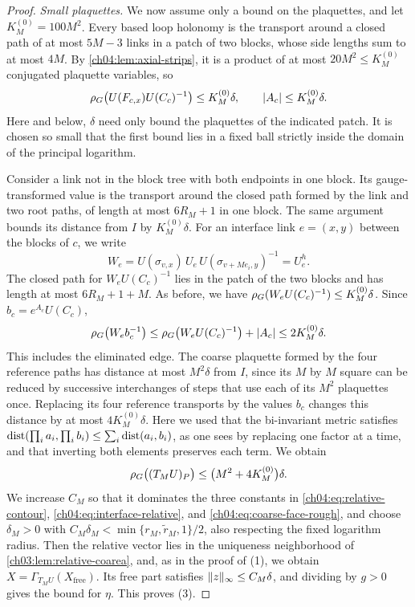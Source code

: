 \begin{proof}
\emph{Small plaquettes.} We now assume only a bound on the plaquettes, and let $K_M^{(0)}=100M^2$. Every based loop holonomy is the transport around a closed path of at most $5M-3$ links in a patch of two blocks, whose side lengths sum to at most $4M$. By \cref{ch04:lem:axial-strips}, it is a product of at most $20M^2\le K_M^{(0)}$ conjugated plaquette variables, so
\begin{equation}\label{ch04:eq:relative-contour}
 \rho_G\bigl(U(F_{c,x})U(C_c)^{-1}\bigr)\le K_M^{(0)}\delta,\qquad\lvert A_c\rvert\le K_M^{(0)}\delta.
\end{equation}
Here and below, $\delta$ need only bound the plaquettes of the indicated patch. It is chosen so small that the first bound lies in a fixed ball strictly inside the domain of the principal logarithm.

Consider a link not in the block tree with both endpoints in one block. Its gauge-transformed value is the transport around the closed path formed by the link and two root paths, of length at most $6R_M+1$ in one block. The same argument bounds its distance from $I$ by $K_M^{(0)}\delta$. For an interface link $e=(x,y)$ between the blocks of $c$, we write
\[
 W_e=U(\sigma_{v,x})\,U_e\,U(\sigma_{v+Me_i,y})^{-1}=U^h_e.
\]
The closed path for $W_eU(C_c)^{-1}$ lies in the patch of the two blocks and has length at most $6R_M+1+M$. As before, we have $\rho_G(W_eU(C_c)^{-1})\le K_M^{(0)}\delta$. Since $b_c=e^{A_c}U(C_c)$,
\begin{equation}\label{ch04:eq:interface-relative}
 \rho_G\bigl(W_eb_c^{-1}\bigr)\le\rho_G\bigl(W_eU(C_c)^{-1}\bigr)+\lvert A_c\rvert\le2K_M^{(0)}\delta.
\end{equation}
This includes the eliminated edge. The coarse plaquette formed by the four reference paths has distance at most $M^2\delta$ from $I$, since its $M$ by $M$ square can be reduced by successive interchanges of steps that use each of its $M^2$ plaquettes once. Replacing its four reference transports by the values $b_c$ changes this distance by at most $4K_M^{(0)}\delta$. Here we used that the bi-invariant metric satisfies $\operatorname{dist}(\prod_ia_i,\prod_ib_i)\le\sum_i\operatorname{dist}(a_i,b_i)$, as one sees by replacing one factor at a time, and that inverting both elements preserves each term. We obtain
\begin{equation}\label{ch04:eq:coarse-face-rough}
 \rho_G\bigl((T_MU)_P\bigr)\le\bigl(M^2+4K_M^{(0)}\bigr)\delta.
\end{equation}
We increase $C_M$ so that it dominates the three constants in \eqref{ch04:eq:relative-contour}, \eqref{ch04:eq:interface-relative}, and \eqref{ch04:eq:coarse-face-rough}, and choose $\delta_M>0$ with $C_M\delta_M<\min\{r_M,\widetilde r_M,1\}/2$, also respecting the fixed logarithm radius. Then the relative vector lies in the uniqueness neighborhood of \cref{ch03:lem:relative-coarea}, and, as in the proof of (1), we obtain $X=\Gamma_{T_MU}(X_{\mathrm{free}})$. Its free part satisfies $\lVert z\rVert_\infty\le C_M\delta$, and dividing by $g>0$ gives the bound for $\eta$. This proves (3).


\end{proof}
